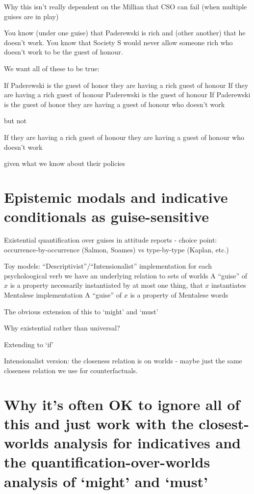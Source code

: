 \documentclass[If.tex]{subfiles}
\begin{document}
Why this isn't really dependent on the Millian  that CSO can fail (when multiple guises are in play)

You know (under one guise) that Paderewski is rich and (other another) that he doesn't work. 
You know that Society S would never allow someone rich who doesn't work to be the guest of honour.

We want all of these to be true: 

If Paderewski is the guest of honor they are having a rich guest of honour
If they are having a rich guest of honour Paderewski is the guest of honour
If Paderewski is the guest of honor they are having a guest of honour who doesn't work

but not

If they are having a rich guest of honour they are having a guest of honour who doesn't work

given what we know about their policies


\section{Epistemic modals and indicative conditionals as guise-sensitive}
Existential quantification over guises in attitude reports 
	- choice point: occurrence-by-occurrence (Salmon, Soames) vs type-by-type (Kaplan, etc.)

Toy models: 
	“Descriptivist”/“Intensionalist” implementation
		for each psycholoogical verb we have an underlying relation to sets of worlds
		A “guise” of $x$ is a property necessarily instantiated by at most one thing, that $x$ instantiates
	Mentalese implementation
		A “guise” of $x$ is a property of Mentalese words

The obvious extension of this to ‘might’ and ‘must’

Why existential rather than universal?  

Extending to ‘if’

Intensionalist version: the closeness relation is on worlds - maybe just the same closeness relation we use for counterfactuals.  


\section{Why it's often OK to ignore all of this and just work with the closest-worlds analysis for indicatives and the quantification-over-worlds analysis of ‘might’ and ‘must’}
\end{document}
